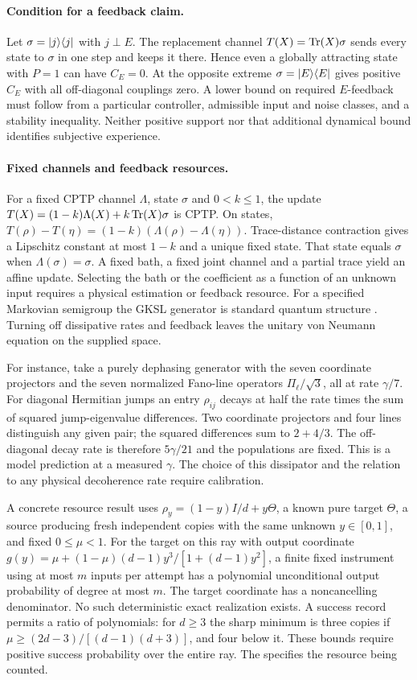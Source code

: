 \paragraph{Condition for a feedback claim.}
Let $\sigma=\lvert j\rangle\langle j\rvert$ with $j\perp E$. The replacement channel $T(X)=\operatorname{Tr}(X)\sigma$ sends every state to $\sigma$ in one step and keeps it there. Hence even a globally attracting state with $P=1$ can have $C_E=0$. At the opposite extreme $\sigma=\lvert E\rangle\langle E\rvert$ gives positive $C_E$ with all off-diagonal couplings zero. A lower bound on required $E$-feedback must follow from a particular controller, admissible input and noise classes, and a stability inequality. Neither positive support nor that additional dynamical bound identifies subjective experience.

\paragraph{Fixed channels and feedback resources.}
For a fixed CPTP channel $\Lambda$, state $\sigma$ and $0<k\le1$, the update $T(X)=(1-k)\Lambda(X)+k\operatorname{Tr}(X)\sigma$ is CPTP. On states, $T(\rho)-T(\eta)=(1-k)(\Lambda(\rho)-\Lambda(\eta))$. Trace-distance contraction gives a Lipschitz constant at most $1-k$ and a unique fixed state. That state equals $\sigma$ when $\Lambda(\sigma)=\sigma$. A fixed bath, a fixed joint channel and a partial trace yield an affine update. Selecting the bath or the coefficient as a function of an unknown input requires a physical estimation or feedback resource. For a specified Markovian semigroup the GKSL generator is standard quantum structure \citep{lindblad1976semigroup}. Turning off dissipative rates and feedback leaves the unitary von Neumann equation on the supplied space.

For instance, take a purely dephasing generator with the seven coordinate projectors and the seven normalized Fano-line operators $\Pi_\ell/\sqrt3$, all at rate $\gamma/7$. For diagonal Hermitian jumps an entry $\rho_{ij}$ decays at half the rate times the sum of squared jump-eigenvalue differences. Two coordinate projectors and four lines distinguish any given pair; the squared differences sum to $2+4/3$. The off-diagonal decay rate is therefore $5\gamma/21$ and the populations are fixed. This is a model prediction at a measured $\gamma$. The choice of this dissipator and the relation to any physical decoherence rate require calibration.

A concrete resource result uses $\rho_y=(1-y)I/d+y\Theta$, a known pure target $\Theta$, a source producing fresh independent copies with the same unknown $y\in[0,1]$, and fixed $0\le\mu<1$. For the target on this ray with output coordinate $g(y)=\mu+(1-\mu)(d-1)y^3/[1+(d-1)y^2]$, a finite fixed instrument using at most $m$ inputs per attempt has a polynomial unconditional output probability of degree at most $m$. The target coordinate has a noncancelling denominator. No such deterministic exact realization exists. A success record permits a ratio of polynomials: for $d\ge3$ the sharp minimum is three copies if $\mu\ge(2d-3)/[(d-1)(d+3)]$, and four below it. These bounds require positive success probability over the entire ray. The  specifies the resource being counted.
